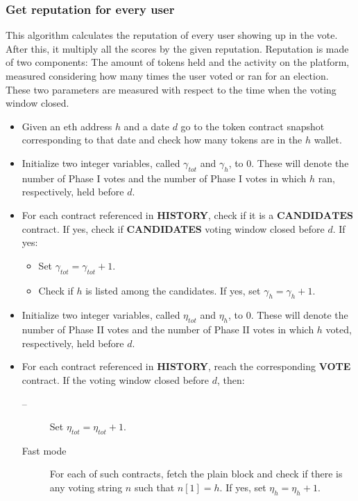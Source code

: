 \documentclass[submission, copyright,creativecommons,sharealike,noncommercial]{eptcs}
\newcommand{\Candidates}{\textbf{CANDIDATES}\xspace}
\newcommand{\Vote}{\textbf{VOTE}\xspace}
\newcommand{\History}{\textbf{HISTORY}\xspace}
\begin{document}
\subsubsection{Get reputation for every user}\label{subsubsec:Get reputation for every user}
	This algorithm calculates the reputation of every user showing up in the vote. After this, it multiply all the scores by the given reputation. Reputation is made of two components: The amount of tokens held and the activity on the platform, measured considering how many times the user voted or ran for an election. These two parameters are measured with respect to the time when the voting window closed.
	\begin{itemize}
		\item Given an eth address $h$ and a date $d$ go to the token contract snapshot corresponding to that date and check how many tokens are in the $h$ wallet.
		
		\item Initialize two integer variables, called $\gamma_{tot}$ and $\gamma_{h}$, to $0$. These will denote the number of Phase I votes and the number of Phase I votes in which $h$ ran, respectively, held before $d$.

		\item For each contract referenced in \History, check if it is a $\Candidates$ contract. If yes, check if \Candidates voting window closed before $d$. If yes:
		 \begin{itemize}
		 	\item Set $\gamma_{tot} = \gamma_{tot}+1$.
		 	\item Check if $h$ is listed among the candidates. If yes, set  $\gamma_{h} = \gamma_{h}+1$.
		 \end{itemize}
	
		\item Initialize two integer variables, called $\eta_{tot}$ and $\eta_{h}$, to $0$. These will denote the number of Phase II votes and the number of Phase II votes in which $h$ voted, respectively, held before $d$.
	
		\item For each contract referenced in \History, reach the corresponding \Vote contract. If the voting window closed before $d$, then: 
		\begin{description}
			\item[--] Set $\eta_{tot} = \eta_{tot}+1$.
	
			\item[Fast mode] For each of such contracts, fetch the plain block and check if there is any voting string $n$ such that $n[1]=h$. If yes, set $\eta_{h} = \eta_{h}+1$.
			

\end{description}
\end{itemize}
\end{document}
